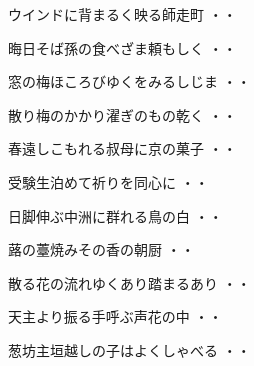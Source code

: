 \vspace{0.6cm}
\begin{shiika}ウインドに背まるく映る師走町
\hfill{・・}\end{shiika}
\vspace{0.6cm}
\begin{shiika}晦日そば孫の食べざま頼もしく
\hfill{・・}\end{shiika}
\vspace{0.6cm}
\begin{shiika}窓の梅ほころびゆくをみるしじま
\hfill{・・}\end{shiika}
\vspace{0.6cm}
\begin{shiika}散り梅のかかり濯ぎのもの乾く
\hfill{・・}\end{shiika}
\vspace{0.6cm}
\begin{shiika}春遠しこもれる叔母に京の菓子
\hfill{・・}\end{shiika}
\vspace{0.6cm}
\begin{shiika}受験生泊めて祈りを同心に
\hfill{・・}\end{shiika}
\vspace{0.6cm}
\begin{shiika}日脚伸ぶ中洲に群れる鳥の白
\hfill{・・}\end{shiika}
\vspace{0.6cm}
\begin{shiika}蕗の薹焼みその香の朝厨
\hfill{・・}\end{shiika}
\vspace{0.6cm}
\begin{shiika}散る花の流れゆくあり踏まるあり
\hfill{・・}\end{shiika}
\vspace{0.6cm}
\begin{shiika}天主より振る手呼ぶ声花の中
\hfill{・・}\end{shiika}
\vspace{0.6cm}
\begin{shiika}葱坊主垣越しの子はよくしゃべる
\hfill{・・}\end{shiika}
